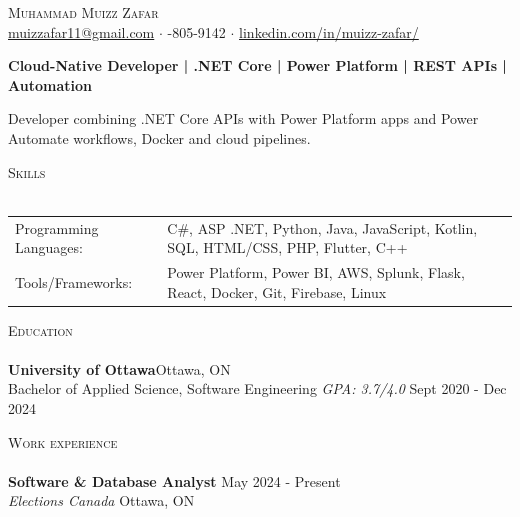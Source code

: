 \documentclass[a4paper]{article}
\newcommand{\lineunder} {
    \vspace*{-8pt} \\
    \hspace*{-18pt} \hrulefill \\
}
\newcommand{\header} [1] {
    {\hspace*{-18pt}\vspace*{6pt} \textsc{#1}}
    \vspace*{-6pt} \lineunder
}
\begin{document}
\vspace*{-40pt}
\vspace*{-10pt}
\begin{center}
	{\Huge \scshape {Muhammad Muizz Zafar}}\\
	\faSend \space \href{mailto:muizzafar11@gmail.com}{muizzafar11@gmail.com} $\cdot$ \faPhoneSquare {}-805-9142 $\cdot$ \faLinkedinSquare \space \href{https://www.linkedin.com/in/muizz-zafar/}{linkedin.com/in/muizz-zafar/}
	\\
\end{center}
\vspace{-5pt}
\begin{center}
\textbf{Cloud-Native Developer | .NET Core | Power Platform | REST APIs | Automation}
\end{center}
\begin{center}
Developer combining .NET Core APIs with Power Platform apps and Power Automate workflows, Docker and cloud pipelines.
\end{center}
\header{Skills}
\begin{tabular}{ l l }
	Programming Languages:        & C\#, ASP .NET, Python, Java, JavaScript, Kotlin, SQL, HTML/CSS, PHP, Flutter, C++\\
	Tools/Frameworks: & Power Platform, Power BI, AWS, Splunk, Flask, React, Docker, Git, Firebase, Linux \\
 \end{tabular}
\vspace{2mm}
\header{Education}
\textbf{University of Ottawa}\hfill Ottawa, ON\\
Bachelor of Applied Science, Software Engineering \textit{GPA: 3.7/4.0} \hfill Sept 2020 - Dec 2024\\
\vspace{2mm}
\header{Work experience}
\vspace{1.5mm}
\textbf{Software \& Database Analyst} \hfill May 2024 - Present\\
\textit{Elections Canada} \hfill Ottawa, ON\\
\vspace{-2mm}
\end{document}
